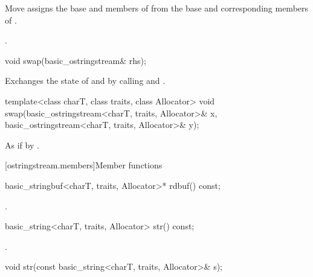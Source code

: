 \begin{itemdescr}
\pnum
\effects Move assigns the base and members of  from the base and corresponding
members of .

\pnum
\returns {}.
\end{itemdescr}

%
\begin{itemdecl}
void swap(basic_ostringstream& rhs);
\end{itemdecl}

\begin{itemdescr}
\pnum
\effects Exchanges the state of  and
 by calling
 and
.
\end{itemdescr}


%
\begin{itemdecl}
template<class charT, class traits, class Allocator>
  void swap(basic_ostringstream<charT, traits, Allocator>& x,
            basic_ostringstream<charT, traits, Allocator>& y);
\end{itemdecl}

\begin{itemdescr}
\pnum
\effects As if by .
\end{itemdescr}

[ostringstream.members]{Member functions}

%
\begin{itemdecl}
basic_stringbuf<charT, traits, Allocator>* rdbuf() const;
\end{itemdecl}

\begin{itemdescr}
\pnum
\returns
{}.
\end{itemdescr}

%
\begin{itemdecl}
basic_string<charT, traits, Allocator> str() const;
\end{itemdecl}

\begin{itemdescr}
\pnum
\returns
{}.
\end{itemdescr}

%
\begin{itemdecl}
void str(const basic_string<charT, traits, Allocator>& s);
\end{itemdecl}

